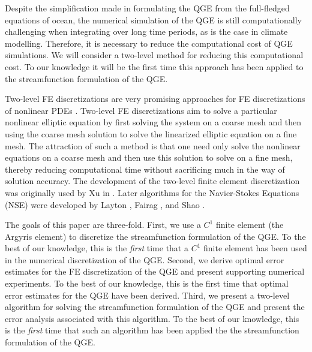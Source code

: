 Despite the simplification made in formulating the QGE from the full-fledged
equations of ocean, the numerical simulation of the QGE is still computationally
challenging when integrating over long time periods, as is the case in climate
modelling. Therefore, it is necessary to reduce the computational cost of QGE
simulations. We will consider a two-level method for reducing this computational
cost. To our knowledge it will be the first time this approach has been applied
to the streamfunction formulation of the QGE.

Two-level FE discretizations are very promising approaches for FE
discretizations of nonlinear PDEs \cite{Fairag98,Layton93}. Two-level FE
discretizations aim to solve a particular nonlinear elliptic equation by
first solving the system on a coarse mesh and then using the coarse mesh
solution to solve the linearized elliptic equation on
a fine mesh. The attraction of such a method is that one need only solve the
nonlinear equations on a coarse mesh and then use this solution to solve on a
fine mesh, thereby reducing computational time without sacrificing much in the
way of solution accuracy. The development of the two-level finite element
discretization was originally used by Xu in \cite{Xu94}. Later algorithms for
the Navier-Stokes Equations (NSE) were developed by Layton \cite{Layton93},
Fairag \cite{Fairag98, Fairag03}, and Shao \cite{Shao11}.

The goals of this paper are three-fold. First, we use a $C^1$ finite element (the
Argyris element) to discretize the streamfunction formulation of the QGE. To the
best of our knowledge, this is the \emph{first} time that a $C^1$ finite element
has been used in the numerical discretization of the QGE. Second, we derive
optimal error estimates for the FE discretization of the QGE and present
supporting numerical experiments. To the best of our knowledge, this is the
first time that optimal error estimates for the QGE have been derived.  Third,
we present a two-level algorithm for solving the streamfunction formulation of
the QGE and present the error analysis associated with this algorithm. To the
best of our knowledge, this is the \emph{first} time that such an algorithm has
been applied the the streamfunction formulation of the QGE.
